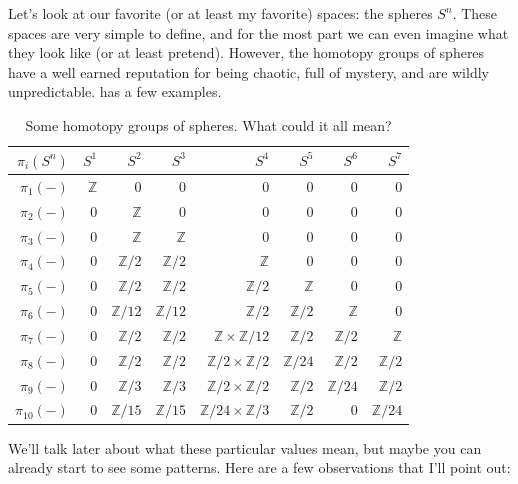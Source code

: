 \documentclass[10pt]{amsart}
\theoremstyle{definition}
\newcommand{\zz}{\mathbb{Z}}
\begin{document}
Let's look at our favorite (or at least my favorite) spaces: the spheres $S^n$. These spaces are very simple to define, and for the most part we can even imagine what they look like (or at least pretend). However, the homotopy groups of spheres have a well earned reputation for being chaotic, full of mystery, and are wildly unpredictable.  has a few examples.
\begin{table}[H]
    \centering
    \setlength{\tabcolsep}{0.5em} %
    {\renewcommand{\arraystretch}{1.2}%
    \begin{tabular}{|r||r|r|r|r|r|r|r|}
        \hline
       $\pi_i(S^n)$ & $S^1$ & $S^2$ & $S^3$  & $S^4$ & $S^5$ & $S^6$ & $S^7$\\
       \hline
       \hline
       $\pi_1(-)$ & $\mathbb{Z}$ & 0 & 0 & 0 & 0 & 0 & 0\\
       $\pi_2(-)$ & 0 & $\mathbb{Z}$ & $0$ & 0 & 0 & 0 & 0 \\
       $\pi_3(-)$ & 0 & $\mathbb{Z}$ & $\mathbb{Z}$ & 0 & 0 & 0 & 0 \\
       $\pi_4(-)$ & 0 & $\mathbb{Z}/2$ & $\mathbb{Z}/2$ & $\mathbb{Z}$ & 0 & 0 & 0 \\
       $\pi_5(-)$ & 0 & $\mathbb{Z}/2$ & $\mathbb{Z}/2$ & $\mathbb{Z}/2$ & $\mathbb{Z}$ & 0  & 0 \\
       $\pi_6(-)$ & 0 & $\mathbb{Z}/12$ & $\zz/12$ & $\zz/2$ & $\zz/2$ & $\zz$ & 0 \\
       $\pi_7(-)$ & 0 & $\zz/2$ & $\zz/2$ & $\zz \times \zz/12$ & $\zz/2$ & $\zz/2$ & $\zz$ \\
       $\pi_8(-)$ & 0 & $\zz/2$ & $\zz/2$ & $\zz/2 \times \zz/2$ & $\zz/24$ & $\zz/2$ & $\zz/2$ \\
       $\pi_9(-)$ & 0 & $\zz/3$ & $\zz/3$ & $\zz/2 \times \zz/2$ & $\zz/2$ & $\zz/24$ & $\zz/2$ \\
       $\pi_{10}(-)$ & 0 & $\zz/15$ & $\zz/15$ & $\zz/24 \times \zz/3$ & $\zz/2$ & 0 & $\zz/24$\\
       \hline
    \end{tabular}}
    \caption{Some homotopy groups of spheres. What could it all mean?}    
    \label{table:homotopy groups of spheres}
\end{table} 
We'll talk later about what these particular values mean, but maybe you can already start to see some patterns. Here are a few observations that I'll point out:
\end{document}
